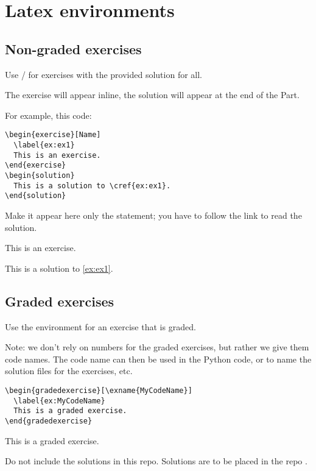 
\section{Latex environments}

\subsection{Non-graded exercises}

Use / for exercises with the provided solution for all.

The exercise will appear inline, the solution will appear at the end of the Part.

For example, this code:

\begin{verbatim}
\begin{exercise}[Name]
  \label{ex:ex1}
  This is an exercise.
\end{exercise}
\begin{solution}
  This is a solution to \cref{ex:ex1}.
\end{solution}
\end{verbatim}

Make it appear here only the statement; you have to follow the link to read the solution.

\begin{exercise}[Name]
    \label{ex:ex1}
    This is an exercise.
\end{exercise}
\begin{solution}
    This is a solution to \cref{ex:ex1}.
\end{solution}

\subsection{Graded exercises}

Use the environment  for an exercise that is graded.

Note: we don't rely on numbers for the graded exercises, but rather we give them code names.
The code name can then be used in the Python code, or to name the solution files for the exercises, etc.

\begin{verbatim}
\begin{gradedexercise}[\exname{MyCodeName}]
  \label{ex:MyCodeName}
  This is a graded exercise.
\end{gradedexercise}
\end{verbatim}

\begin{gradedexercise}
    This is a graded exercise.
\end{gradedexercise}

Do not include the solutions in this repo.
Solutions are to be placed in the repo .

